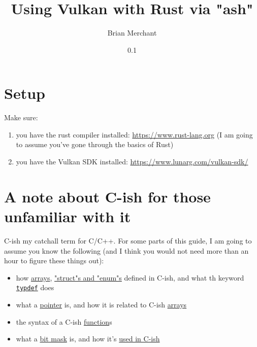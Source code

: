 \documentclass[12pt,letterpaper]{article}
\newcommand{\cil}[1]{\texttt{#1}}
\begin{document}
\title{Using Vulkan with Rust via "ash"}
\date{0.1}
\author{Brian Merchant}
\maketitle
\tableofcontents
\reversemarginpar


\section{Setup}
	Make sure:
		\begin{enumerate}
			\item you have the rust compiler installed: \href{https://www.rust-lang.org}{https://www.rust-lang.org} (I am going to assume you've gone through the basics of Rust)
			
			\item you have the Vulkan SDK installed: \href{https://www.lunarg.com/vulkan-sdk/}{https://www.lunarg.com/vulkan-sdk/}
		\end{enumerate}
	
\section{A note about C-ish for those unfamiliar with it}
	C-ish my catchall term for C/C++. For some parts of this guide, I am going to assume you know the following (and I think you would not need more than an hour to figure these things out):
		\begin{itemize}
			\item how \href{https://en.wikibooks.org/wiki/C_Programming/Arrays_and_strings}{arrays}, \href{https://en.wikibooks.org/wiki/C_Programming/Advanced_data_types}{"struct"s and "enum"s} defined in C-ish, and what th keyword \href{https://en.wikibooks.org/wiki/C_Programming/Advanced_data_types}{\cil{typdef}} does
			
			\item what a \href{https://en.wikibooks.org/wiki/C_Programming/Pointers_and_arrays}{pointer} is, and how it is related to C-ish \href{https://en.wikibooks.org/wiki/C_Programming/Pointers_and_arrays#Pointers_and_Arrays}{arrays}
			
			\item the syntax of a C-ish \href{https://en.wikibooks.org/wiki/C_Programming/Procedures_and_functions}{function}s
			
			\item what a \href{https://en.wikipedia.org/wiki/Mask_(computing)}{bit mask} is, and how it's \href{https://stackoverflow.com/questions/10493411/what-is-bit-masking}{used in C-ish}
		\end{itemize}
	
\end{document}
